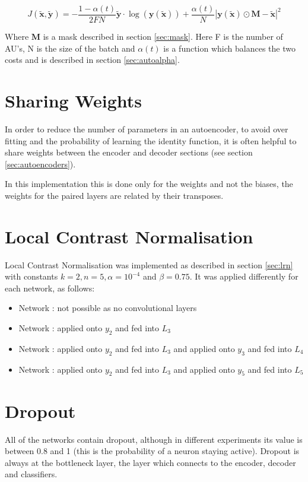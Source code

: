    \begin{equation} \label{eq:l2_cost_model1}
        J(\tilde{\mathbf{x}},\tilde{\mathbf{y}}) = -\frac{1-\alpha(t)}{2FN}\tilde{\mathbf{y}}\cdot\log(\mathbf{y}(\tilde{\mathbf{x}}))
        + \frac{\alpha(t)}{N}\left |\mathbf{y}(\tilde{\mathbf{x}}) \odot \mathbf{M}-\tilde{\mathbf{x}}\right | ^2
    \end{equation}

    Where $\mathbf{M}$ is a mask described in section \ref{sec:mask}. Here F is the number of AU's, N is the size of the batch and $\alpha(t)$ is a
    function which balances the two costs and is described in section \ref{sec:autoalpha}.

    

  \clearpage


  \section{Sharing Weights}
    In order to reduce the number of parameters in an autoencoder, to avoid over
    fitting and the probability of learning the identity function, it is often
    helpful to share weights between the encoder and decoder sections (see section
    \ref{sec:autoencoders}).

    In this implementation this is done only for the weights and not the biases,
    the weights for the paired layers are related by their transposes.
  \section{Local Contrast Normalisation}
    Local Contrast Normalisation was implemented as described in section \ref{sec:lrn} with
    constants $k=2,n=5,\alpha=10^{-4}$ and $\beta=0.75$.
    It was applied differently for each network, as follows:
    \begin{itemize}
      \item Network \networkI   : not possible as no convolutional layers
      \item Network \networkII  : applied onto $y_2$ and fed into $L_3$
      \item Network \networkIII : applied onto $y_2$ and fed into $L_3$ and applied onto $y_3$ and fed into $L_4$
      \item Network \networkIV  : applied onto $y_2$ and fed into $L_3$ and applied onto $y_5$ and fed into $L_5$
    \end{itemize}
  \section{Dropout}
    All of the networks contain dropout, although in different experiments its
    value is between 0.8 and 1 (this is the probability of a neuron staying
    active). Dropout is always at the bottleneck layer, the layer which
    connects to the encoder, decoder and classifiers.
